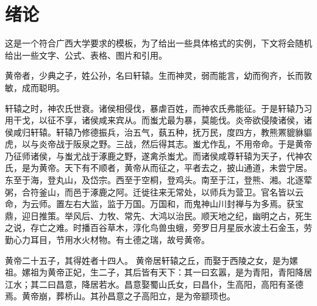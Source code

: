 \documentclass[UTF8,12pt,AutoFakeBold]{ctexart}
\begin{document}
{\hypersetup{colorlinks=true,linkcolor=black}\tableofcontents}
\newpage
\setcounter{page}{1} %
\pagestyle{fancy}%
\fancyhf{}
\fancyfoot[C]{\thepage} %
\section{绪论\label{绪论}}
这是一个符合广西大学要求的模板，为了给出一些具体格式的实例，下文将会随机给出一些文字、公式、表格、图片和引用\cite{doi:10.1080/00107514.2012.685693,annurev:/content/journals/10.1146/annurev-nucl-102014-022137,GROOM1986323,doi:10.1142/S0217751X20300124}。
\par
黄帝者，少典之子，姓公孙，名曰轩辕。生而神灵，弱而能言，幼而徇齐，长而敦敏，成而聪明\cite{HOOFT1974276,PismaZhETF.20.430}。
\par
轩辕之时，神农氏世衰。诸侯相侵伐，暴虐百姓，而神农氏弗能征。于是轩辕乃习用干戈，以征不享，诸侯咸来宾从。而蚩尤最为暴，莫能伐。炎帝欲侵陵诸侯，诸侯咸归轩辕。轩辕乃修德振兵，治五气，蓺五种，抚万民，度四方，教熊罴貔貅貙虎，以与炎帝战于阪泉之野。三战，然后得其志。蚩尤作乱，不用帝命。于是黄帝乃征师诸侯，与蚩尤战于涿鹿之野，遂禽杀蚩尤。而诸侯咸尊轩辕为天子\cite{PhysRevLett.33.451}，代神农氏，是为黄帝。天下有不顺者，黄帝从而征之，平者去之，披山通道，未尝宁居。
东至于海，登丸山，及岱宗。西至于空桐，登鸡头。南至于江，登熊、湘。北逐荤粥，合符釜山，而邑于涿鹿之阿。迁徙往来无常处，以师兵为营卫。官名皆以云命，为云师。置左右大监，监于万国。万国和，而鬼神山川封禅与为多焉。获宝鼎，迎日推策。举风后、力牧、常先、大鸿以治民。顺天地之纪，幽明之占，死生之说，存亡之难。时播百谷草木，淳化鸟兽虫蛾，旁罗日月星辰水波土石金玉，劳勤心力耳目，节用水火材物。有土德之瑞，故号黄帝。
\par
黄帝二十五子，其得姓者十四人。
黄帝居轩辕之丘，而娶于西陵之女，是为嫘祖。嫘祖为黄帝正妃，生二子，其后皆有天下：其一曰玄嚣，是为青阳\cite{STAROBINSKY198099,PhysRevD.23.347}，青阳降居江水；其二曰昌意，降居若水。昌意娶蜀山氏女，曰昌仆，生高阳，高阳有圣德焉。黄帝崩，葬桥山。其孙昌意之子高阳立，是为帝颛顼也。
\end{document}
